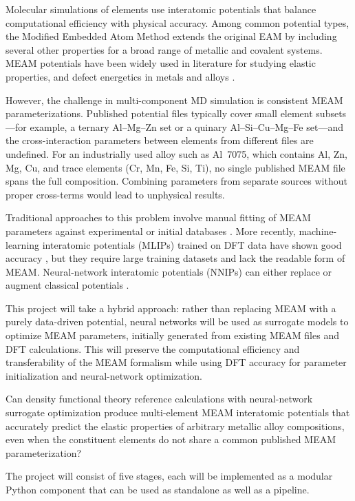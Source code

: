 \documentclass{phys400proposal}
\begin{document}
Molecular simulations of elements use interatomic potentials that balance computational efficiency with physical accuracy. Among common potential types, the Modified Embedded Atom Method \citep{baskes1992} extends the original EAM by including several other properties for a broad range of metallic and covalent systems. MEAM potentials have been widely used in literature for studying elastic properties, and defect energetics in metals and alloys \citep{lee2001}.

However, the challenge in multi-component MD simulation is consistent MEAM parameterizations. Published potential files typically cover small element subsets---for example, a ternary Al--Mg--Zn set\citep{Dickel_2018} or a quinary Al--Si--Cu--Mg--Fe set\citep{jelinek2012}---and the cross-interaction parameters between elements from different files are undefined. For an industrially used alloy such as Al~7075, which contains Al, Zn, Mg, Cu, and trace elements (Cr, Mn, Fe, Si, Ti), no single published MEAM file spans the full composition. Combining parameters from separate sources without proper cross-terms would lead to unphysical results.

Traditional approaches to this problem involve manual fitting of MEAM parameters against experimental or initial databases \citep{jelinek2012}. More recently, machine-learning interatomic potentials (MLIPs) trained on DFT data have shown good accuracy \citep{behler2007, shapeev2016}, but they require large training datasets and lack the readable form of MEAM. Neural-network interatomic potentials (NNIPs) can either replace or augment classical potentials \citep{mishin2021}.

This project will take a hybrid approach: rather than replacing MEAM with a purely data-driven potential, neural networks will be used as surrogate models to optimize MEAM parameters, initially generated from existing MEAM files and DFT calculations. This will preserve the computational efficiency and transferability of the MEAM formalism while using DFT accuracy for parameter initialization and neural-network optimization.

\researchquestion
Can density functional theory reference calculations with neural-network surrogate optimization produce multi-element MEAM interatomic potentials that accurately predict the elastic properties of arbitrary metallic alloy compositions, even when the constituent elements do not share a common published MEAM parameterization?

\methodology
The project will consist of five stages, each will be implemented as a modular Python component that can be used as standalone as well as a pipeline.
\end{document}
